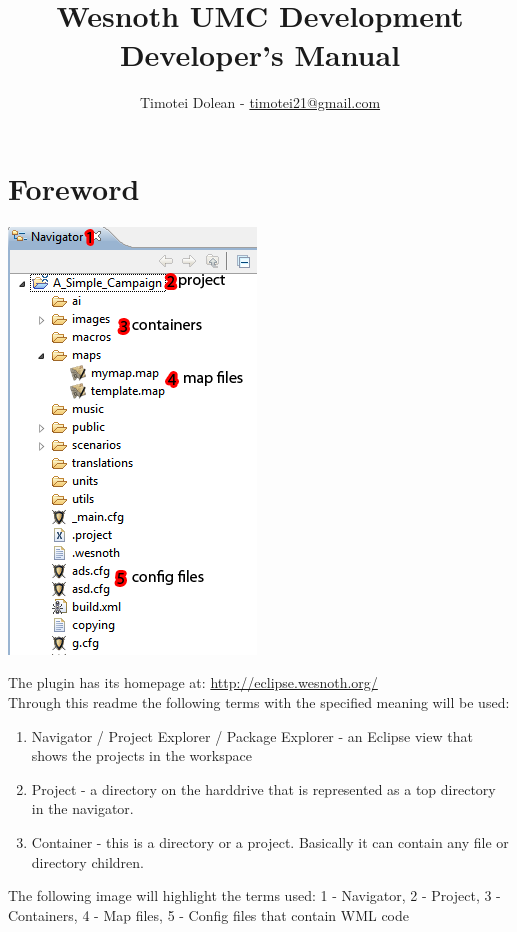 \documentclass[10pt]{article}
\title{Wesnoth UMC Development \\ Developer's Manual}
\author{Timotei Dolean - \href{mailto:timotei21@gmail.com}{timotei21@gmail.com}}
\begin{document}
\maketitle

\tableofcontents
\setcounter{tocdepth}{3}
\newpage

\newcommand{\icnt}{ \stepcounter{cnt} \thecnt }

\section{Foreword}
\begin{multicols}{2}
  \begin{center}
    \includegraphics[scale=0.6]{definitions.png}
  \end{center}

The plugin has its homepage at: \href{http://eclipse.wesnoth.org/}{http://eclipse.wesnoth.org/} \\


Through this readme the following terms with the specified meaning will be used:
\begin{enumerate}
\item Navigator / Project Explorer / Package Explorer - an Eclipse view that shows the projects in the workspace
\item Project - a directory on the harddrive that is represented as a top directory in the navigator.
\item Container - this is a directory or a project. Basically it can contain any file or directory children.
\end{enumerate}

The following image will highlight the terms used: 1 - Navigator, 2 - Project, 3 - Containers, 4 - Map files, 5 - Config files that contain WML code
\end{multicols}
\end{document}
